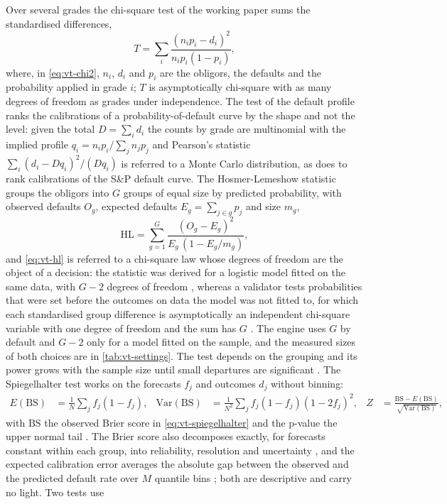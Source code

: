 Over several grades the chi-square test of the working paper sums the standardised differences,
\begin{equation}
  T=\sum_{i}\frac{(n_i p_i-d_i)^2}{n_i p_i(1-p_i)},
  \label{eq:vt-chi2}
\end{equation}
where, in \cref{eq:vt-chi2}, $n_i$, $d_i$ and $p_i$ are the obligors, the defaults and the probability applied in grade $i$; $T$ is asymptotically chi-square with as many degrees
of freedom as grades under independence. The test of the default profile ranks the calibrations of a probability-of-default curve by the shape and not
the level: given the total $D=\sum_i d_i$ the counts by grade are multinomial with the implied profile $q_i=n_ip_i/\sum_j n_jp_j$ and Pearson's statistic
$\sum_i(d_i-Dq_i)^2/(Dq_i)$ is referred to a Monte Carlo distribution, as \citet{ratings:tasche2013} does to rank calibrations of the S\&P default
curve. The Hosmer-Lemeshow statistic groups the obligors into $G$ groups of equal size by predicted probability, with observed defaults $O_g$, expected defaults
$E_g=\sum_{j\in g}p_j$ and size $m_g$,
\begin{equation}
  \mathrm{HL}=\sum_{g=1}^{G}\frac{(O_g-E_g)^2}{E_g\,(1-E_g/m_g)},
  \label{eq:vt-hl}
\end{equation}
and \cref{eq:vt-hl} is referred to a chi-square law whose degrees of freedom are the object of a decision: the statistic was derived for a logistic model fitted on the same
data, with $G-2$ degrees of freedom \citep{credit-scoring:hosmer1980}, whereas a validator tests probabilities that were set before the outcomes on data the
model was not fitted to, for which each standardised group difference is asymptotically an independent chi-square variable with one degree of freedom and the
sum has $G$ \citep{credit-scoring:bcbswp14}. The engine uses $G$ by default and $G-2$ only for a model fitted on the sample, and the measured sizes of both
choices are in \cref{tab:vt-settings}. The test depends on the grouping \citep{validation-tests:hosmer1997} and its power grows with the sample size until small
departures are significant \citep{validation-tests:paul2013}. The Spiegelhalter test works on the forecasts $f_j$ and outcomes $d_j$ without binning:
\begin{align}
  E(\mathrm{BS})&=\frac1N\sum_j f_j(1-f_j), & \mathrm{Var}(\mathrm{BS})&=\frac1{N^2}\sum_j f_j(1-f_j)(1-2f_j)^2, & Z&=\frac{\mathrm{BS}-E(\mathrm{BS})}{\sqrt{\mathrm{Var}(\mathrm{BS})}},
  \label{eq:vt-spiegelhalter}
\end{align}
with $\mathrm{BS}$ the observed Brier score in \cref{eq:vt-spiegelhalter} and the p-value the upper normal tail \citep{credit-scoring:spiegelhalter1986,credit-scoring:brier1950}. The Brier score also decomposes exactly, for forecasts constant within each group, into reliability, resolution and uncertainty \citep{credit-scoring:murphy1973}, and the expected calibration error averages the absolute gap between the observed and the predicted default rate over $M$ quantile bins \citep{credit-scoring:naeini2015,validation-tests:guo2017}; both are descriptive and carry no light. Two tests use
